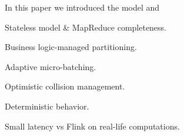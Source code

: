 
\label {fs-conclusion-tection}

In this paper we introduced the model and 

Stateless model & MapReduce completeness.

Business logic-managed partitioning.

Adaptive micro-batching.

Optimistic collision management.

Deterministic behavior.

Small latency vs Flink on real-life computations.









